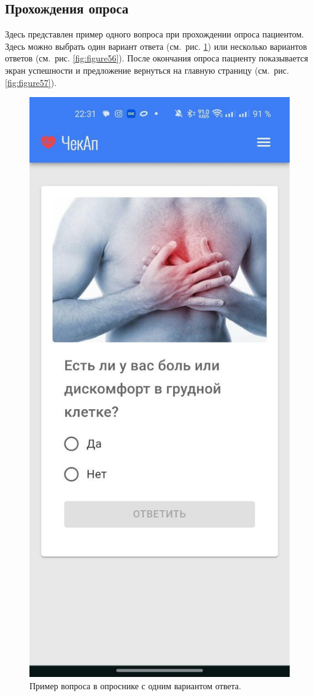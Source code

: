\subsection{Прохождения опроса}\label{subsec:-213}
Здесь представлен пример одного вопроса при прохождении опроса пациентом.
Здесь можно выбрать один вариант ответа (см.\ рис. \ref{fig:figure54}) или несколько вариантов ответов (см.\ рис. \ref{fig:figure56}).
После окончания опроса пациенту показывается экран успешности и предложение вернуться на главную страницу (см.\ рис. \ref{fig:figure57}).

\begin{figure}[htbp]
    \centering
    \includegraphics[height=\dimexpr\textheight/3\relax]{images/screenshots/process_inquirer}
    \caption{Пример вопроса в опроснике с одним вариантом ответа.}
    \label{fig:figure54}
\end{figure}

